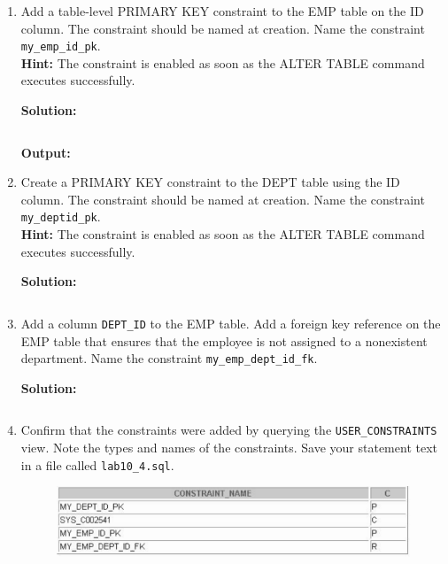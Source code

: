 \begin{enumerate}

\item Add a table-level PRIMARY KEY constraint to the EMP table on the ID column. The constraint
should be named at creation. Name the constraint \texttt{my\_emp\_id\_pk}.\\
\textbf{Hint: }The constraint is enabled as soon as the ALTER TABLE command executes
successfully.

\textbf{Solution: }
\begin{lstlisting}[language=SQL]

\end{lstlisting}
\textbf{Output: }

\item Create a PRIMARY KEY constraint to the DEPT table using the ID column. The constraint should
be named at creation. Name the constraint \texttt{my\_deptid\_pk}.\\
\textbf{Hint: }The constraint is enabled as soon as the ALTER TABLE command executes
successfully.

\textbf{Solution: }
\begin{lstlisting}[language=SQL]

\end{lstlisting}

\item Add a column \texttt{DEPT\_ID} to the EMP table. Add a foreign key reference on the EMP table that
ensures that the employee is not assigned to a nonexistent department. Name the constraint
\texttt{my\_emp\_dept\_id\_fk}.

\textbf{Solution: }
\begin{lstlisting}[language=SQL]

\end{lstlisting}

\item Confirm that the constraints were added by querying the \texttt{USER\_CONSTRAINTS} view. Note the
types and names of the constraints. Save your statement text in a file called \texttt{lab10\_4.sql}.
\begin{figure}[h]
\centering
    \includegraphics[width=.7\linewidth]{graphics/104.png}
\end{figure}


\end{enumerate}
